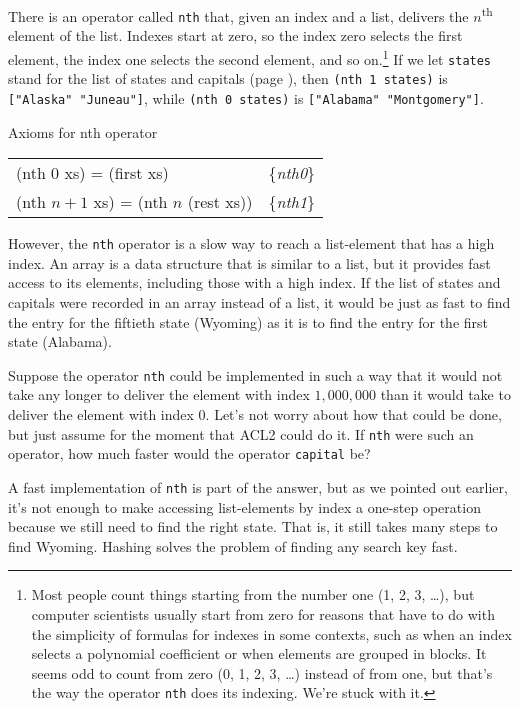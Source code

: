 There is an operator called \texttt{nth} that,
given an index and a list, delivers the
$n$\textsuperscript{th} element of the list.
Indexes start at zero, so the index
zero selects the first element,
the index one selects the second element,
and so on.\footnote{Most people
count things starting from the number one (1, 2, 3, \dots), but
computer scientists usually start from zero for reasons that
have to do with the simplicity of formulas for indexes
in some contexts, such
as when an index selects a polynomial coefficient
or when elements are grouped in blocks.
It seems odd to count from
zero (0, 1, 2, 3, \dots) instead of from one,
but that's the way the operator
\texttt{nth} does its indexing. We're stuck with it.}
If we let \texttt{states} stand for the list of states and capitals
(page \pageref{states-capitals-list}), then
\texttt{(nth 1 states)} is \texttt{["Alaska" "Juneau"]},
while \texttt{(nth 0 states)} is \texttt{["Alabama" "Montgomery"]}.

\begin{center}
Axioms for nth operator
\begin{tabular}{ll}
(nth 0 xs) = (first xs)  & \{\emph{nth0}\}     \\
(nth $n+1$ xs) = (nth $n$ (rest xs)) & \{\emph{nth1}\} \\
\end{tabular}
\end{center}

However, the \texttt{nth} operator is a slow way to reach a
list-element that has a high index.
An array is a data structure that is
similar to a list, but it provides fast access to its
elements, including those with a high index.
If the list of states and capitals were recorded in an array instead
of a list, it would be just as fast to find the entry for the
fiftieth state (Wyoming) as it is to find the entry
for the first state (Alabama).

Suppose the operator \texttt{nth} could be implemented
in such a way that it would not take any longer to
deliver the element with index $1,000,000$ than it would take
to deliver the element with index $0$.
Let's not worry about how that could be done, but
just assume for the moment that ACL2 could do it.
If \texttt{nth} were such an operator,
how much faster would the operator \texttt{capital} be?

A fast implementation of \texttt{nth} is part of
the answer, but as we pointed out earlier,
it's not enough to make accessing list-elements 
by index a one-step operation
because we still need to find the right state.
That is, it still takes many steps to find Wyoming.
Hashing solves the problem of finding any search key fast.

